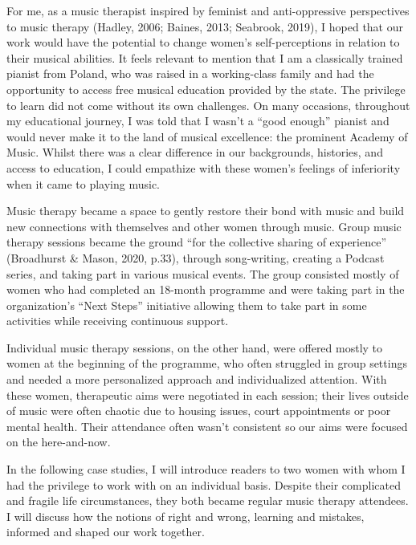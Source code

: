 \documentclass[authordate, empirical]{jote-new-article}
\begin{document}
For me, as a music therapist inspired by feminist and anti-oppressive perspectives to music therapy (Hadley, 2006; Baines, 2013; Seabrook, 2019), I hoped that our work would have the potential to change women's self-perceptions in relation to their musical abilities. It feels relevant to mention that I am a classically trained pianist from Poland, who was raised in a working-class family and had the opportunity to access free musical education provided by the state. The privilege to learn did not come without its own challenges. On many occasions, throughout my educational journey, I was told that I wasn't a “good enough” pianist and would never make it to the land of musical excellence: the prominent Academy of Music. Whilst there was a clear difference in our backgrounds, histories, and access to education, I could empathize with these women's feelings of inferiority when it came to playing music.







Music therapy became a space to gently restore their bond with music and build new connections with themselves and other women through music. Group music therapy sessions became the ground “for the collective sharing of experience” (Broadhurst \& Mason, 2020, p.33), through song-writing, creating a Podcast series, and taking part in various musical events. The group consisted mostly of women who had completed an 18-month programme and were taking part in the organization's “Next Steps” initiative allowing them to take part in some activities while receiving continuous support.



Individual music therapy sessions, on the other hand, were offered mostly to women at the beginning of the programme, who often struggled in group settings and needed a more personalized approach and individualized attention. With these women, therapeutic aims were negotiated in each session; their lives outside of music were often chaotic due to housing issues, court appointments or poor mental health. Their attendance often wasn't consistent so our aims were focused on the here-and-now.







In the following case studies, I will introduce readers to two women with whom I had the privilege to work with on an individual basis. Despite their complicated and fragile life circumstances, they both became regular music therapy attendees. I will discuss how the notions of right and wrong, learning and mistakes, informed and shaped our work together.
\end{document}

